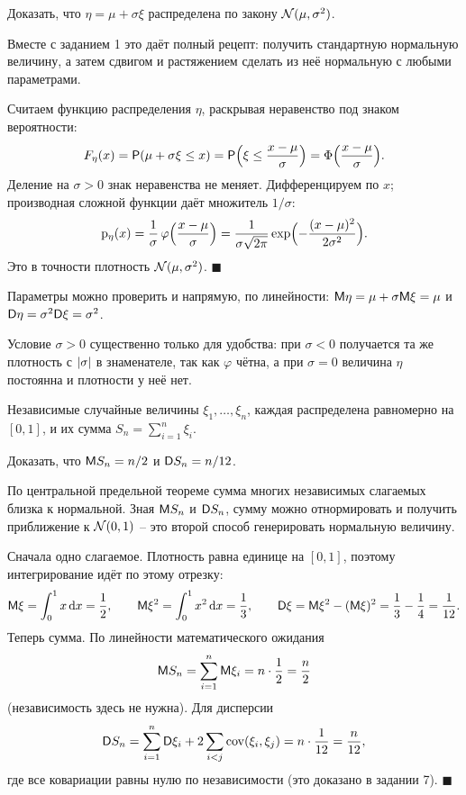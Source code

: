 \documentclass[12pt,a4paper]{article}
\begin{document}
\treb Доказать, что $\eta = \mu + \sigma\xi$ распределена по закону
$\mathcal{N}(\mu,\sigma^2)$.

\zachem Вместе с заданием 1 это даёт полный рецепт: получить стандартную
нормальную величину, а затем сдвигом и растяжением сделать из неё нормальную
с любыми параметрами.

\resh Считаем функцию распределения $\eta$, раскрывая неравенство под знаком
вероятности:
\[
  F_\eta(x) = \mathsf{P}(\mu + \sigma\xi \le x)
            = \mathsf{P}\Bigl(\xi \le \frac{x-\mu}{\sigma}\Bigr)
            = \Phi\Bigl(\frac{x-\mu}{\sigma}\Bigr).
\]
Деление на $\sigma > 0$ знак неравенства не меняет. Дифференцируем по $x$;
производная сложной функции даёт множитель $1/\sigma$:
\[
  \mathrm{p}_\eta(x) = \frac{1}{\sigma}\,\varphi\Bigl(\frac{x-\mu}{\sigma}\Bigr)
  = \frac{1}{\sigma\sqrt{2\pi}}\exp\Bigl(-\frac{(x-\mu)^2}{2\sigma^2}\Bigr).
\]
Это в точности плотность $\mathcal{N}(\mu,\sigma^2)$. $\blacksquare$

Параметры можно проверить и напрямую, по линейности:
$\mathsf{M}\eta = \mu + \sigma\mathsf{M}\xi = \mu$ и $\mathsf{D}\eta = \sigma^2\mathsf{D}\xi = \sigma^2$.

Условие $\sigma > 0$ существенно только для удобства: при $\sigma < 0$
получается та же плотность с $\left\lvert \sigma \right\rvert$ в знаменателе, так как $\varphi$
чётна, а при $\sigma = 0$ величина $\eta$ постоянна и плотности у неё нет.

\dano Независимые случайные величины $\xi_1,\dots,\xi_n$, каждая распределена
равномерно на $[0,1]$, и их сумма $S_n = \sum_{i=1}^{n}\xi_i$.

\treb Доказать, что $\mathsf{M} S_n = n/2$ и $\mathsf{D} S_n = n/12$.

\zachem По центральной предельной теореме сумма многих независимых слагаемых
близка к нормальной. Зная $\mathsf{M} S_n$ и $\mathsf{D} S_n$, сумму можно
отнормировать и получить приближение к $\mathcal{N}(0,1)$ -- это второй способ
генерировать нормальную величину.

\resh Сначала одно слагаемое. Плотность равна единице на $[0,1]$, поэтому
интегрирование идёт по этому отрезку:
\[
  \mathsf{M}\xi = \int_0^1 x\,\mathrm{d} x = \frac12,
  \qquad
  \mathsf{M}\xi^2 = \int_0^1 x^2\,\mathrm{d} x = \frac13,
  \qquad
  \mathsf{D}\xi = \mathsf{M}\xi^2 - (\mathsf{M}\xi)^2 = \frac13 - \frac14 = \frac{1}{12}.
\]
Теперь сумма. По линейности математического ожидания
\[
  \mathsf{M} S_n = \sum_{i=1}^{n}\mathsf{M}\xi_i = n\cdot\frac12 = \frac{n}{2}
\]
(независимость здесь не нужна). Для дисперсии
\[
  \mathsf{D} S_n = \sum_{i=1}^{n}\mathsf{D}\xi_i + 2\sum_{i<j}\mathrm{cov}(\xi_i,\xi_j)
           = n\cdot\frac{1}{12} = \frac{n}{12},
\]
где все ковариации равны нулю по независимости (это доказано в задании 7).
$\blacksquare$
\end{document}
